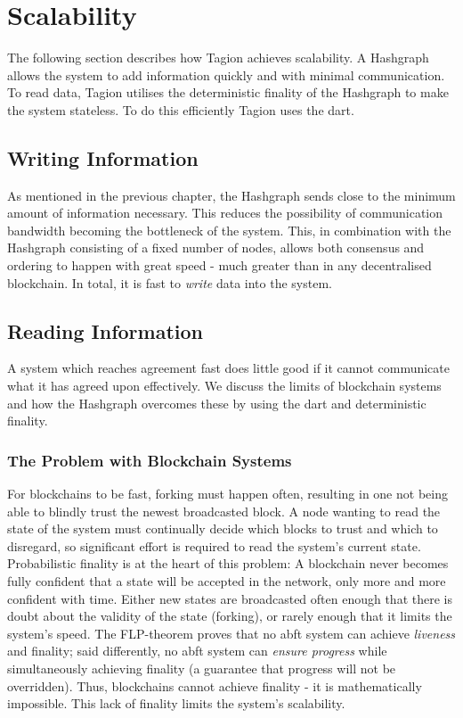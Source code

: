 \section{Scalability} \label{sec:scalability}
    The following section describes how Tagion achieves scalability. A Hashgraph allows the system to add information quickly and with minimal communication. To read data, Tagion utilises the deterministic \gls{finality} of the Hashgraph to make the system stateless. To do this efficiently Tagion uses the \gls{dart}.

\subsection{Writing Information}
    As mentioned in the previous chapter, the Hashgraph sends close to the minimum amount of information necessary. This reduces the possibility of communication bandwidth becoming the bottleneck of the system. This, in combination with the Hashgraph consisting of a fixed number of nodes, allows both consensus and ordering to happen with great speed - much greater than in any decentralised blockchain. In total, it is fast to \textit{write} data into the system.

\subsection{Reading Information}
    A system which reaches agreement fast does little good if it cannot communicate what it has agreed upon effectively. We discuss the limits of blockchain systems and how the Hashgraph overcomes these by using the \gls{dart} and deterministic \gls{finality}.

\subsubsection{The Problem with Blockchain Systems}
    For blockchains to be fast, forking must happen often, resulting in one not being able to blindly trust the newest broadcasted block. A node wanting to read the state of the system must continually decide which blocks to trust and which to disregard, so significant effort is required to read the system's current state. Probabilistic \gls{finality} is at the heart of this problem: A blockchain never becomes fully confident that a state will be accepted in the network, only more and more confident with time. Either new states are broadcasted often enough that there is doubt about the validity of the state (forking), or rarely enough that it limits the system's speed. The FLP-theorem\cite{flp_impossibility} proves that no \gls{abft} system can achieve \textit{\gls{liveness}} and \gls{finality}; said differently, no \gls{abft} system can \textit{ensure progress} while simultaneously achieving \gls{finality} (a guarantee that progress will not be overridden). Thus, blockchains cannot achieve \gls{finality} - it is mathematically impossible. This lack of \gls{finality} limits the system's scalability.

